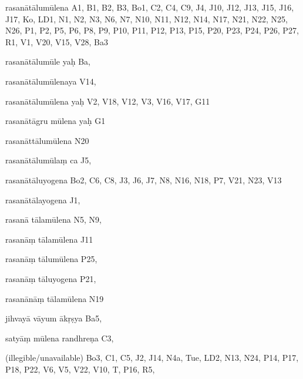 \begin{ekdosis}
\begin{marma}[hp01_055]
\begin{marma}[hp02_009]
\begin{marma}[hp02_011]
 \begin{marma}[hp02_57a]
\item[rasanātālumūlena] A1, B1, B2, B3, Bo1, C2, C4, C9, J4, J10, J12, J13, J15, J16, J17, Ko, LD1, N1, N2, N3, N6, N7, N10, N11, N12, N14, N17, N21, N22, N25, N26, P1, P2, P5, P6, P8, P9, P10, P11, P12, P13, P15, P20, P23, P24, P26, P27, R1, V1, V20, V15, V28, Ba3
\item[rasanātālumūle yaḥ] Ba,
\item[rasanātālumūlenaya] V14,
\item[rasanātālumūlena yaḥ] V2, V18, V12, V3, V16, V17, G11
\item[rasanātāgru mūlena yaḥ] G1
\item[rasanāttālumūlena] N20
\item[rasanātālumūlaṃ ca] J5, 
\item[rasanātāluyogena] Bo2, C6, C8, J3, J6, J7, N8, N16, N18, P7, V21, N23, V13
\item[rasanātālayogena] J1,
\item[rasanā tālamūlena] N5, N9, 
\item[rasanāṃ tālamūlena] J11
\item[rasanāṃ tālumūlena] P25,
\item[rasanāṃ tāluyogena] P21, 
\item[rasanānāṃ tālamūlena] N19
\item[jihvayā vāyum ākṛṣya] Ba5,
\item[satyāṃ mūlena randhreṇa] C3,
\item[]
\item[(illegible/unavailable)] Bo3, C1, C5, J2, J14, N4a, Tue, LD2, N13, N24, P14, P17, P18, P22, V6, V5, V22, V10, T, P16, R5,
  \begin{description}

    \end{description}
 \end{marma}


\end{marma}
\end{marma}
\end{marma}
\end{ekdosis}
